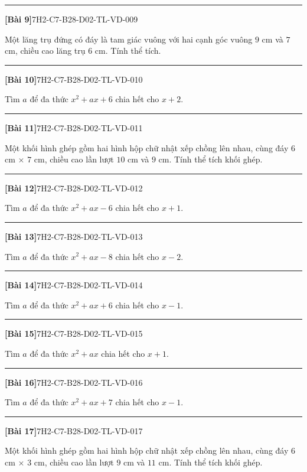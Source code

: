 \documentclass[12pt,a4paper]{article}
\newif\ifloigiai
\newenvironment{cauhoi}[2]{%
  \par\medskip\noindent\rule{\textwidth}{0.4pt}\par\nopagebreak
  \noindent\textbf{[#1]}\hfill{\scriptsize\ttfamily #2}\par\nopagebreak\smallskip}{\par}
\newcommand{\loigiai}[1]{\ifloigiai\par\smallskip\noindent\textit{Lời giải.} #1\par\fi}
\begin{document}
\begin{cauhoi}{Bài 9}{7H2-C7-B28-D02-TL-VD-009}
Một lăng trụ đứng có đáy là tam giác vuông với hai cạnh góc vuông $9$ cm và $7$ cm, chiều cao lăng trụ $6$ cm. Tính thể tích.
\loigiai{Diện tích đáy là $\dfrac{9\cdot 7}{2}=31,5$ ($\text{cm}^2$). Thể tích là $31,5\cdot 6=189$ ($\text{cm}^3$).}
\end{cauhoi}
\begin{cauhoi}{Bài 10}{7H2-C7-B28-D02-TL-VD-010}
Tìm $a$ để đa thức $x^{2}+ax+6$ chia hết cho $x+2$.
\loigiai{Đa thức chia hết cho $x+2$ khi $x=-2$ là nghiệm: $4-2a+6=0$, suy ra $a=5$.}
\end{cauhoi}
\begin{cauhoi}{Bài 11}{7H2-C7-B28-D02-TL-VD-011}
Một khối hình ghép gồm hai hình hộp chữ nhật xếp chồng lên nhau, cùng đáy $6$ cm $\times$ $7$ cm, chiều cao lần lượt $10$ cm và $9$ cm. Tính thể tích khối ghép.
\loigiai{Thể tích hai khối là $6\cdot 7\cdot 10=420$ và $6\cdot 7\cdot 9=378$ ($\text{cm}^3$). Thể tích khối ghép là $420+378=798$ ($\text{cm}^3$).}
\end{cauhoi}
\begin{cauhoi}{Bài 12}{7H2-C7-B28-D02-TL-VD-012}
Tìm $a$ để đa thức $x^{2}+ax-6$ chia hết cho $x+1$.
\loigiai{Đa thức chia hết cho $x+1$ khi $x=-1$ là nghiệm: $1-a-6=0$, suy ra $a=-5$.}
\end{cauhoi}
\begin{cauhoi}{Bài 13}{7H2-C7-B28-D02-TL-VD-013}
Tìm $a$ để đa thức $x^{2}+ax-8$ chia hết cho $x-2$.
\loigiai{Đa thức chia hết cho $x-2$ khi $x=2$ là nghiệm: $4+2a-8=0$, suy ra $a=2$.}
\end{cauhoi}
\begin{cauhoi}{Bài 14}{7H2-C7-B28-D02-TL-VD-014}
Tìm $a$ để đa thức $x^{2}+ax+6$ chia hết cho $x-1$.
\loigiai{Đa thức chia hết cho $x-1$ khi $x=1$ là nghiệm: $1+a+6=0$, suy ra $a=-7$.}
\end{cauhoi}
\begin{cauhoi}{Bài 15}{7H2-C7-B28-D02-TL-VD-015}
Tìm $a$ để đa thức $x^{2}+ax$ chia hết cho $x+1$.
\loigiai{Đa thức chia hết cho $x+1$ khi $x=-1$ là nghiệm: $1-a=0$, suy ra $a=1$.}
\end{cauhoi}
\begin{cauhoi}{Bài 16}{7H2-C7-B28-D02-TL-VD-016}
Tìm $a$ để đa thức $x^{2}+ax+7$ chia hết cho $x-1$.
\loigiai{Đa thức chia hết cho $x-1$ khi $x=1$ là nghiệm: $1+a+7=0$, suy ra $a=-8$.}
\end{cauhoi}
\begin{cauhoi}{Bài 17}{7H2-C7-B28-D02-TL-VD-017}
Một khối hình ghép gồm hai hình hộp chữ nhật xếp chồng lên nhau, cùng đáy $6$ cm $\times$ $3$ cm, chiều cao lần lượt $9$ cm và $11$ cm. Tính thể tích khối ghép.
\loigiai{Thể tích hai khối là $6\cdot 3\cdot 9=162$ và $6\cdot 3\cdot 11=198$ ($\text{cm}^3$). Thể tích khối ghép là $162+198=360$ ($\text{cm}^3$).}
\end{cauhoi}
\end{document}

